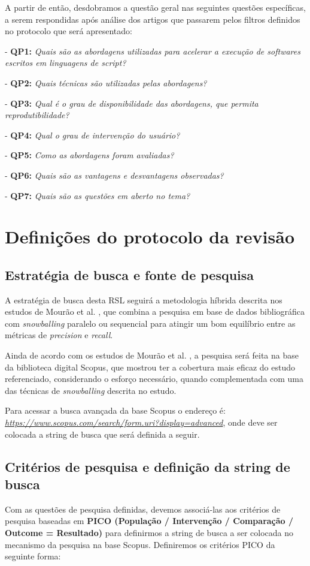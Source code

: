 \documentclass[sigconf]{acmart}
\begin{document}
A partir de então, desdobramos a questão geral nas seguintes questões específicas, a serem respondidas após análise dos artigos que passarem pelos filtros definidos no protocolo que será apresentado:  

- \textbf{QP1:} {\textit{Quais são as abordagens utilizadas para acelerar a execução de softwares escritos em linguagens de script?}}

- \textbf{QP2:} {\textit{Quais técnicas são utilizadas pelas abordagens?}}

- \textbf{QP3:} {\textit{Qual é o grau de disponibilidade das abordagens, que permita reprodutibilidade?}}

- \textbf{QP4:} {\textit{Qual o grau de intervenção do usuário?}}

- \textbf{QP5:} {\textit{Como as abordagens foram avaliadas?}}

- \textbf{QP6:} {\textit{Quais são as vantagens e desvantagens observadas?}}

- \textbf{QP7:} {\textit{Quais são as questões em aberto no tema?}}


\section{Definições do protocolo da revisão}
\subsection{Estratégia de busca e fonte de pesquisa}
A estratégia de busca desta RSL seguirá a metodologia híbrida descrita nos estudos de Mourão et al. \cite{mourao2020performance}, que combina a pesquisa em base de dados bibliográfica com \textit{snowballing} paralelo ou sequencial para atingir um bom equilíbrio entre as métricas de \textit{precision} e \textit{recall}.

Ainda de acordo com os estudos de Mourão et al. \cite{mourao2020performance}, a pesquisa será feita na base da biblioteca digital Scopus, que mostrou ter a cobertura mais eficaz do estudo referenciado, considerando o esforço necessário, quando complementada com uma das técnicas de \textit{snowballing} descrita no estudo.

Para acessar a busca avançada da base Scopus o endereço é: \textit{\url{https://www.scopus.com/search/form.uri?display=advanced}}, onde deve ser colocada a string de busca que será definida a seguir.


\subsection{Critérios de pesquisa e definição da string de busca}
Com as questões de pesquisa definidas, devemos associá-las aos critérios de pesquisa baseadas em \textbf{PICO (População / Intervenção / Comparação / Outcome = Resultado)} para definirmos a string de busca a ser colocada no mecanismo da pesquisa na base Scopus. Definiremos os critérios PICO da seguinte forma:
\end{document}
